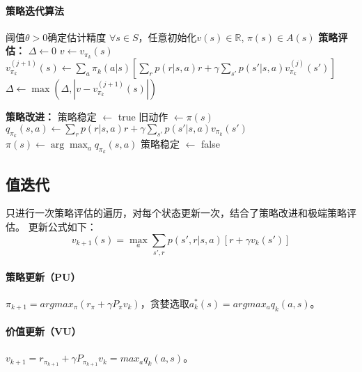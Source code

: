 \documentclass[
12pt, %
a4paper, 
oneside, %
headinclude,footinclude, %
]{scrartcl}
\begin{document}
\paragraph{策略迭代算法}
\begin{myalgorithm}[策略迭代算法]
\State 阈值$\theta > 0$确定估计精度
\State $\forall s \in S$，任意初始化$v(s) \in \mathbb{R}$, $\pi(s) \in A(s)$
\Repeat
    \State \textbf{策略评估：}
    \Repeat
        \State $\Delta \gets 0$
            \State $v \gets v_{\pi_k}(s)$
            \State $v_{\pi_k}^{(j+1)}(s) \gets \sum_a \pi_k(a|s)[\sum_r p(r|s,a)r + \gamma \sum_{s'}p(s'|s,a)v_{\pi_k}^{(j)}(s')]$
            \State $\Delta \gets \max(\Delta, |v - v_{\pi_k}^{(j+1)}(s)|)$
        \EndFor
    \Until{$\Delta < \theta$}
    
    \State \textbf{策略改进：}
    \State 策略稳定 $\gets$ true
        \State 旧动作 $\gets \pi(s)$
            \State $q_{\pi_k}(s,a) \gets \sum_r p(r|s,a)r + \gamma \sum_{s'} p(s'|s,a)v_{\pi_k}(s')$
        \EndFor
        \State $\pi(s) \gets \arg\max_a q_{\pi_k}(s,a)$
            \State 策略稳定 $\gets$ false
        \EndIf
    \EndFor
{}
\end{myalgorithm}
\subsection{值迭代}
只进行一次策略评估的遍历，对每个状态更新一次，结合了策略改进和极端策略评估。
更新公式如下：
$$
v_{k + 1}(s) = \max_a \sum_{s', r} p(s', r|s, a)[r + \gamma v_k(s')]
$$
\paragraph{策略更新（PU）}
$ \pi_{k + 1} = argmax_{\pi}(r_{\pi} + \gamma P_{\pi}v_k) $，贪婪选取$ a^*_k(s) = argmax_a q_k(a, s) $。
\paragraph{价值更新（VU）}
$ v_{k + 1} = r_{\pi_{k + 1}} + \gamma P_{\pi_{k + 1}}v_k = max_a q_k(a, s) $。
\end{document}
